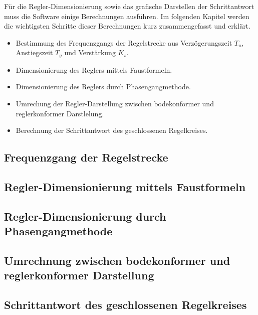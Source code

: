 F\"ur   die  Regler-Dimensionierung   sowie  das   grafische  Darstellen   der
Schrittantwort  muss   die  Software  einige  Berechnungen   ausf\"uhren.   Im
folgenden  Kapitel werden  die wichtigsten  Schritte dieser  Berechnungen kurz
zusammengefasst und erkl\"art.

\begin{itemize}
    \item
    Bestimmung  des  Frequenzgangs  der  Regelstrecke  aus  Verz\"ogerungszeit
    $T_u$, Anstiegszeit $T_g$ und Verst\"arkung $K_s$.
    \item
    Dimensionierung des Reglers mittels Faustformeln.
    \item
    Dimensionierung des Reglers durch Phasengangmethode.
    \item
    Umrechung der Regler-Darstellung zwischen bodekonformer und reglerkonformer
    Darstlelung. 
    \item
    Berechnung der Schrittantwort des geschlossenen Regelkreises.
\end{itemize}

\subsection{Frequenzgang der Regelstrecke}


\subsection{Regler-Dimensionierung mittels Faustformeln}


\subsection{Regler-Dimensionierung durch Phasengangmethode}


\subsection{Umrechnung zwischen bodekonformer und reglerkonformer Darstellung}


\subsection{Schrittantwort des geschlossenen Regelkreises}

